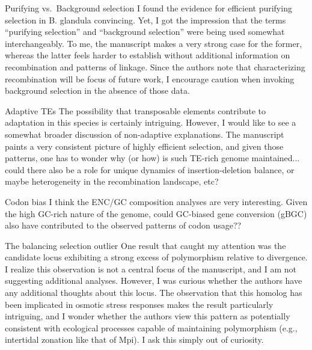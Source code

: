 
\begin{point}{Purifying vs.\ Background selection}
I found the evidence for efficient purifying selection in B. glandula
convincing. Yet, I got the impression that the terms ``purifying
selection'' and ``background selection'' were being used somewhat
interchangeably. To me, the manuscript makes a very strong case for the
former, whereas the latter feels harder to establish without additional
information on recombination and patterns of linkage. Since the authors
note that characterizing recombination will be focus of future work, I
encourage caution when invoking background selection in the absence of
those data.
\end{point}


\begin{point}{Adaptive TEs}
The possibility that transposable elements contribute to adaptation in
this species is certainly intriguing. However, I would like to see a
somewhat broader discussion of non-adaptive explanations. The manuscript
paints a very consistent picture of highly efficient selection, and given
those patterns, one has to wonder why (or how) is such TE-rich genome
maintained... could there also be a role for unique dynamics of
insertion-deletion balance, or maybe heterogeneity in the recombination
landscape, etc?
\end{point}


\begin{point}{Codon bias}
I think the ENC/GC composition analyses are very interesting. Given the
high GC-rich nature of the genome, could GC-biased gene conversion (gBGC)
also have contributed to the observed patterns of codon usage??
\end{point}


\begin{point}{The balancing selection outlier}
One result that caught my attention was the candidate locus exhibiting a
strong excess of polymorphism relative to divergence. I realize this
observation is not a central focus of the manuscript, and I am not
suggesting additional analyses. However, I was curious whether the
authors have any additional thoughts about this locus. The observation
that this homolog has been implicated in osmotic stress responses makes
the result particularly intriguing, and I wonder whether the authors view
this pattern as potentially consistent with ecological processes capable
of maintaining polymorphism (e.g., intertidal zonation like that of Mpi).
I ask this simply out of curiosity.
\end{point}

